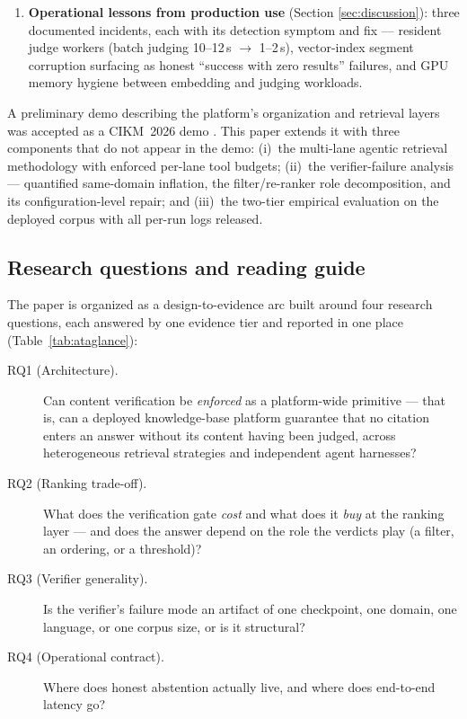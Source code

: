 \documentclass[preprint,12pt]{elsarticle}
\begin{document}
\begin{enumerate}
unsafe as an ordering), a threshold that never abstains out of corpus,
and robustness of both the failure and the repair to question paraphrase
and to the choice of verification signal.
Mitigations (hierarchical reading, relative cuts with floors, calibration)
are scoped to what this decomposition supports.
\item \textbf{Operational lessons from production use} (Section
\ref{sec:discussion}): three documented incidents, each with its detection
symptom and fix --- resident judge workers (batch judging 10--12\,s
$\to$ 1--2\,s), vector-index segment corruption surfacing as honest
``success with zero results'' failures, and GPU memory hygiene between
embedding and judging workloads.
\end{enumerate}

A preliminary demo describing the platform's organization and retrieval
layers was accepted as a CIKM~2026 demo \cite{qdcvr-demo}. This paper extends
it with three components that do not appear in the demo: (i)~the multi-lane
agentic retrieval methodology with enforced per-lane tool budgets; (ii)~the
verifier-failure analysis --- quantified same-domain inflation, the
filter/re-ranker role decomposition, and its configuration-level repair;
and (iii)~the two-tier empirical evaluation on the deployed corpus with all
per-run logs released.

\subsection{Research questions and reading guide}
\label{sec:rq}
The paper is organized as a design-to-evidence arc built around four research
questions, each answered by one evidence tier and reported in one place
(Table~\ref{tab:ataglance}):

\begin{description}
\item[RQ1 (Architecture).] Can content verification be \emph{enforced} as a
platform-wide primitive --- that is, can a deployed knowledge-base platform
guarantee that no citation enters an answer without its content having been
judged, across heterogeneous retrieval strategies and independent agent
harnesses?
\item[RQ2 (Ranking trade-off).] What does the verification gate \emph{cost}
and what does it \emph{buy} at the ranking layer --- and does the answer depend
on the role the verdicts play (a filter, an ordering, or a threshold)?
\item[RQ3 (Verifier generality).] Is the verifier's failure mode an artifact
of one checkpoint, one domain, one language, or one corpus size, or is it
structural?
\item[RQ4 (Operational contract).] Where does honest abstention actually live,
and where does end-to-end latency go?
\end{description}
\end{document}
